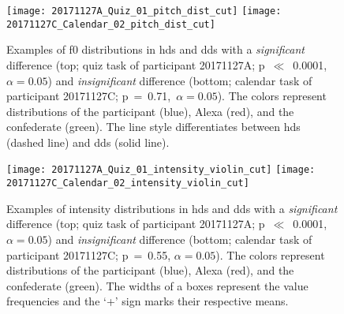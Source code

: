 \begin{figure}
	\centering
	\texttt{[image: 20171127A\_Quiz\_01\_pitch\_dist\_cut]}
	\texttt{[image: 20171127C\_Calendar\_02\_pitch\_dist\_cut]}
	\vspace{0.3cm}
	\caption[Interactions with significant and insignificant \acs{f0} distribution]
		{Examples of \ac{f0} distributions in \ac{hds} and \ac{dds} with a \emph{significant} difference (top; quiz task of participant 20171127A; p~$\ll$~0.0001,~$\alpha=0.05$) and \emph{insignificant} difference (bottom; calendar task of participant 20171127C; p~=~0.71,~$\alpha=0.05$).
		The colors represent distributions of the participant (blue), Alexa (red), and the confederate (green).
		The line style differentiates between \ac{hds} (dashed line) and \ac{dds} (solid line).}
	\label{fig:hds_dds_dist}
\end{figure}
%
\begin{figure}
	\texttt{[image: 20171127A\_Quiz\_01\_intensity\_violin\_cut]}
	\texttt{[image: 20171127C\_Calendar\_02\_intensity\_violin\_cut]}
	\caption[Interactions with significant and insignificant intensity differences]
		{Examples of intensity distributions in \ac{hds} and \ac{dds} with a \emph{significant} difference (top; quiz task of participant 20171127A; p~$\ll$~0.0001, $\alpha=0.05$) and \emph{insignificant} difference (bottom; calendar task of participant 20171127C; p~=~0.55, $\alpha=0.05$).
		The colors represent distributions of the participant (blue), Alexa (red), and the confederate (green).
		The widths of a boxes represent the value frequencies and the \enquote*{+} sign marks their respective means.}
	\label{fig:hds_dds_violin}
\end{figure}

